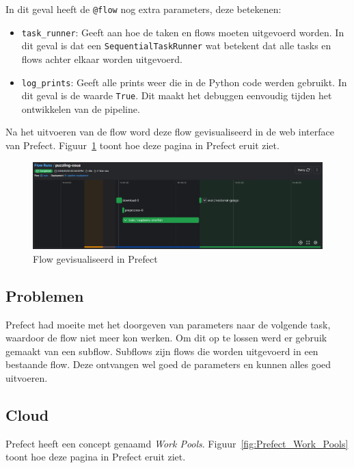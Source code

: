 In dit geval heeft de \texttt{@flow} nog extra parameters, deze betekenen:

\begin{itemize}
    \item \texttt{task\_runner}: Geeft aan hoe de taken en flows moeten uitgevoerd worden. In dit geval is dat een \texttt{SequentialTaskRunner} wat betekent dat alle tasks en flows achter elkaar worden uitgevoerd.
    \item \texttt{log\_prints}: Geeft alle prints weer die in de Python code werden gebruikt. In dit geval is de waarde \texttt{True}. Dit maakt het debuggen eenvoudig tijden het ontwikkelen van de pipeline.
\end{itemize}

Na het uitvoeren van de flow word deze flow gevisualiseerd in de web interface van Prefect. Figuur~\ref{fig:Prefect_Flow} toont hoe deze pagina in Prefect eruit ziet.
\begin{figure}[h]
    \centering
    \includegraphics[width=0.9\linewidth]{graphics/Prefect_Flow.PNG}
    \caption{Flow gevisualiseerd in Prefect}
    \label{fig:Prefect_Flow}
\end{figure}

\subsection{Problemen}

Prefect had moeite met het doorgeven van parameters naar de volgende task, waardoor de flow niet meer kon werken. Om dit op te lossen werd er gebruik gemaakt van een subflow. Subflows zijn flows die worden uitgevoerd in een bestaande flow. Deze ontvangen wel goed de parameters en kunnen alles goed uitvoeren.

\subsection{Cloud}

Prefect heeft een concept genaamd \textit{Work Pools}. Figuur~\ref{fig:Prefect_Work_Pools} toont hoe deze pagina in Prefect eruit ziet.

